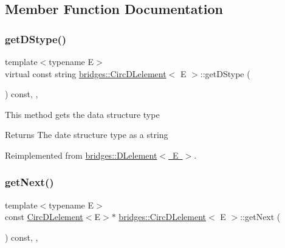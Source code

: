 \subsection{Member Function Documentation}
\mbox{\label{classbridges_1_1_circ_d_lelement_a0e199fe681755df694807261ce2460c2}} 
\subsubsection{\texorpdfstring{get\+D\+Stype()}{getDStype()}}
{\footnotesize\ttfamily template$<$typename E$>$ \\
virtual const string \mbox{\hyperlink{classbridges_1_1_circ_d_lelement}{bridges\+::\+Circ\+D\+Lelement}}$<$ E $>$\+::get\+D\+Stype (\begin{DoxyParamCaption}{ }\end{DoxyParamCaption}) const\hspace{0.3cm}{\ttfamily [inline]}, {\ttfamily [override]}, {\ttfamily [virtual]}}

This method gets the data structure type

\begin{DoxyReturn}{Returns}
The date structure type as a string 
\end{DoxyReturn}


Reimplemented from \mbox{\hyperlink{classbridges_1_1_d_lelement_a109be7aba8bd3d0450859938b5d3144c}{bridges\+::\+D\+Lelement$<$ E $>$}}.

\mbox{\label{classbridges_1_1_circ_d_lelement_ac266d60bd2f7ce92cb38a12875a6a468}} 
\subsubsection{\texorpdfstring{get\+Next()}{getNext()}\hspace{0.1cm}{\footnotesize\ttfamily [1/2]}}
{\footnotesize\ttfamily template$<$typename E$>$ \\
const \mbox{\hyperlink{classbridges_1_1_circ_d_lelement}{Circ\+D\+Lelement}}$<$E$>$$\ast$ \mbox{\hyperlink{classbridges_1_1_circ_d_lelement}{bridges\+::\+Circ\+D\+Lelement}}$<$ E $>$\+::get\+Next (\begin{DoxyParamCaption}{ }\end{DoxyParamCaption}) const\hspace{0.3cm}{\ttfamily [inline]}, {\ttfamily [override]}, {\ttfamily [virtual]}}

